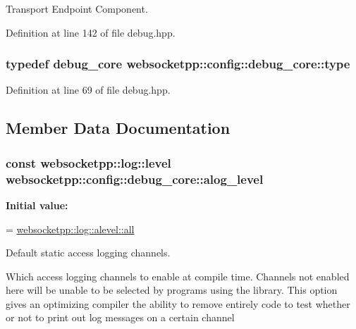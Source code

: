 Transport Endpoint Component. 



Definition at line 142 of file debug.\+hpp.

\hypertarget{structwebsocketpp_1_1config_1_1debug__core_a5c32a974103fef0bad45f0f66bf20e8e}{}
\subsubsection[{type}]{\setlength{\rightskip}{0pt plus 5cm}typedef {\bf debug\+\_\+core} {\bf websocketpp\+::config\+::debug\+\_\+core\+::type}}\label{structwebsocketpp_1_1config_1_1debug__core_a5c32a974103fef0bad45f0f66bf20e8e}


Definition at line 69 of file debug.\+hpp.



\subsection{Member Data Documentation}
\hypertarget{structwebsocketpp_1_1config_1_1debug__core_afed6fcfe2f8950b959713c7459e3645c}{}
\subsubsection[{alog\+\_\+level}]{\setlength{\rightskip}{0pt plus 5cm}const {\bf websocketpp\+::log\+::level} websocketpp\+::config\+::debug\+\_\+core\+::alog\+\_\+level\hspace{0.3cm}{\ttfamily [static]}}\label{structwebsocketpp_1_1config_1_1debug__core_afed6fcfe2f8950b959713c7459e3645c}
{\bfseries Initial value\+:}
\begin{DoxyCode}
=
        \hyperlink{structwebsocketpp_1_1log_1_1alevel_a853aa0b8976e53f3181af3bc398d493e}{websocketpp::log::alevel::all}
\end{DoxyCode}


Default static access logging channels. 

Which access logging channels to enable at compile time. Channels not enabled here will be unable to be selected by programs using the library. This option gives an optimizing compiler the ability to remove entirely code to test whether or not to print out log messages on a certain channel

